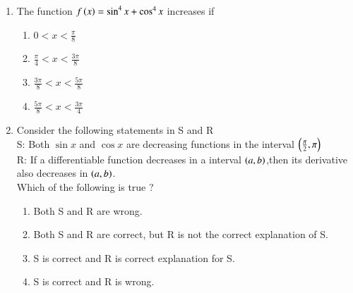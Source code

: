 \documentclass[journal]{IEEEtran}
\begin{document}
\begin{enumerate}[start=9]
\item The function $f\left(x\right)= \sin^4{x}+\cos^4{x}$ increases if \hfill {}
\begin{multicols}{4}
\begin{enumerate}
    \item $0<x<\frac{\pi}{8}$
    \item $\frac{\pi}{4}<x<\frac{3\pi}{8}$
    \item $\frac{3\pi}{8} <x<\frac{5\pi}{8}$
    \item $\frac{5\pi}{8}<x<\frac{3\pi}{4}$
\end{enumerate}
\end{multicols}
\item Consider the following statements in S and R \hfill {}\\
S: Both $\sin{x}$ and $\cos{x}$ are decreasing functions in the interval $\left(\frac{\pi}{2},\pi\right)$\\
R: If a differentiable function decreases in a interval $\left(a,b\right)$,then its derivative also decreases in $\left(a,b\right)$.\\
Which of the following is true ?
\begin{enumerate}
    \item Both S and R are wrong.
    \item Both S and R are correct, but R is not the correct explanation of S.
    \item S is correct and R is correct explanation for S.
    \item S is correct and R is wrong.
\end{enumerate}


\end{enumerate}
\end{document}
